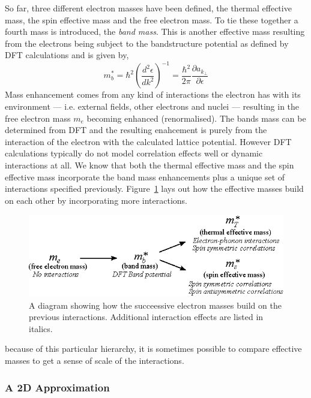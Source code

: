 So far, three different electron masses have been defined, the thermal effective mass, the spin effective mass and the free electron mass. To tie these together a fourth mass is introduced, the \textit{band mass}. This is another effective mass resulting from the electrons being subject to the bandstructure potential as defined by \ac{DFT} calculations and is given by,
\begin{equation}
  m^*_b = \hbar^2 \left(\frac{d^2\epsilon}{dk^2}\right)^{-1} = \frac{\hbar^2}{2\pi}\frac{\partial a_{k_\perp}}{\partial \epsilon}
\end{equation}
Mass enhancement comes from any kind of interactions the electron has with its environment --- i.e. external fields, other electrons and nuclei --- resulting in the free electron mass $m_e$ becoming enhanced (renormalised). The bands mass can be determined from \ac{DFT} and the resulting enahcement is purely from the interaction of the electron with the calculated lattice potential. However \ac{DFT} calculations typically do not model correlation effects well or dynamic interactions at all. We know that both the thermal effective mass and the spin effective mass incorporate the band mass enhancements plus a unique set of interactions specified previously. Figure~\ref{Fig:Theo:EffectiveMassInheritance} lays out how the effective masses build on each other by incorporating more interactions.
\begin{figure}[htbp]
    \begin{center}
        \includegraphics[scale=0.9]{Chapter-Theory/Figures/EffectiveMassInheritance/EffectiveMassInheritance}
        \caption{A diagram showing how the succeessive electron masses build on the previous interactions. Additional interaction effects are listed in italics.}
        \label{Fig:Theo:EffectiveMassInheritance}
    \end{center}
\end{figure}
because of this particular hierarchy, it is sometimes possible to compare effective masses to get a sense of scale of the interactions.

\subsubsection{A 2D Approximation}

